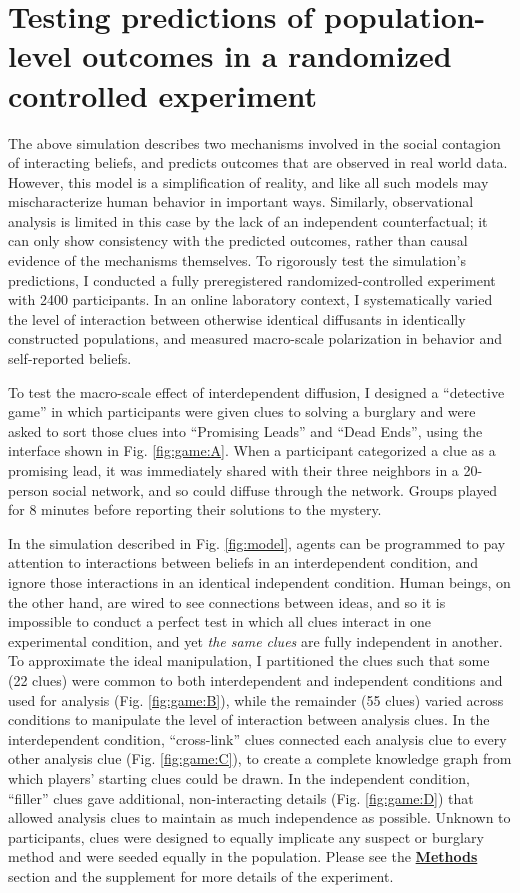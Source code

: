 \documentclass[9pt,twocolumn,twoside,lineno]{pnas-new}
\begin{document}
\section*{Testing predictions of population-level outcomes in a randomized controlled experiment}
The above simulation describes two mechanisms involved in the social contagion of interacting beliefs, and predicts outcomes that are observed in real world data. However, this model is a simplification of reality, and like all such models may mischaracterize human behavior in important ways. Similarly, observational analysis is limited in this case by the lack of an independent counterfactual; it can only show consistency with the predicted outcomes, rather than causal evidence of the mechanisms themselves. To rigorously test the simulation’s predictions, I conducted a fully preregistered randomized-controlled experiment with 2400 participants. In an online laboratory context, I systematically varied the level of interaction between otherwise identical diffusants in identically constructed populations, and measured macro-scale polarization in behavior and self-reported beliefs. 

To test the macro-scale effect of interdependent diffusion, I designed a ``detective game'' in which participants were given clues to solving a burglary and were asked to sort those clues into ``Promising Leads'' and ``Dead Ends'', using the interface shown in Fig. \ref{fig:game:A}.  When a participant categorized a clue as a promising lead, it was immediately shared with their three neighbors in a 20-person social network, and so could diffuse through the network. Groups played for 8 minutes before reporting their solutions to the mystery. 

In the simulation described in Fig. \ref{fig:model}, agents can be programmed to pay attention to interactions between beliefs in an interdependent condition, and ignore those interactions in an identical independent condition. Human beings, on the other hand, are wired to see connections between ideas, and so it is impossible to conduct a perfect test in which all clues interact in one experimental condition, and yet \textit{the same clues} are fully independent in another. To approximate the ideal manipulation, I partitioned the clues such that some (22 clues) were common to both interdependent and independent conditions and used for analysis (Fig. \ref{fig:game:B}), while the remainder (55 clues) varied across conditions to manipulate the level of interaction between analysis clues. In the interdependent condition, ``cross-link'' clues connected each analysis clue to every other analysis clue (Fig. \ref{fig:game:C}), to create a complete knowledge graph from which players' starting clues could be drawn. In the independent condition, ``filler'' clues gave additional, non-interacting details (Fig. \ref{fig:game:D}) that allowed analysis clues to maintain as much independence as possible. Unknown to participants, clues were designed to equally implicate any suspect or burglary method and were seeded equally in the population. Please see the \hyperref[methods]{\textbf{Methods}} section and the supplement for more details of the experiment.
\end{document}
